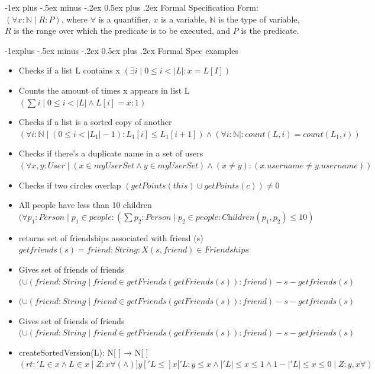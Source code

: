 \documentclass[letterpaper, 8pt]{extarticle}
\makeatletter
\renewcommand{\section}{\@startsection{section}{1}{0mm}%
                                {-1ex plus -.5ex minus -.2ex}%
                                {0.5ex plus .2ex}%
                                {\normalfont\normalsize\bfseries}}
\renewcommand{\subsection}{\@startsection{subsection}{2}{0mm}%
                                {-1explus -.5ex minus -.2ex}%
                                {0.5ex plus .2ex}%
                                {\normalfont\small\bfseries}}
\makeatother
\begin{document}
\begin{multicols*}{5}
  \section{Formal Specification}
  Form: $(\forall x : \mathbb{N} \mid R : P)$,
  where $\forall$ is a quantifier, $x$ is a variable, $\mathbb{N}$ is the type of variable,
  $R$ is the range over which the predicate is to be executed, and $P$ is the predicate.

  \subsection{Formal Spec examples}
  \begin{itemize}
  \setlength\itemsep{0.9em}
    \item Checks if a list L contains x
    $(\exists i \mid 0 \leq i < |L| : x = L [I])$
    \item Counts the amount of times x appears in list L
    $(\sum i \mid 0 \leq i < |L| \land L[i] = x: 1)$
    \item Checks if a list is a sorted copy of another
    $(\forall i: \mathbb{N} \mid (0 \leq i < |L_1| - 1): L_1[i] \leq L_1[i + 1]) \land (\forall i : \mathbb{N}|: count(L, i) = count(L_1, i))$
    \item Checks if there's a duplicate name in a set of users
    $(\forall x,y: User \mid (x \in myUserSet \land y \in myUserSet) \land (x \neq y) : (x.username \neq y.username))$
    \item Checks if two circles overlap
    $(getPoints(this) \cup getPoints(c)) \neq 0$
    \item All people have less than 10 children
    $(\forall p_1 : Person \mid p_1 \in people : (\sum p_2 : Person \mid p_2 \in people: \textit{Children}(p_1, p_2) \leq 10)$
    \item returns set of friendships associated with friend (s)
    $ getfriends(s) = {friend:String:X(s,friend)\in Friendships}$
    \item Gives set of friends of friends
    $(\cup (friend : String \mid friend \in getFriends(getFriends(s)) : friend)-{s}-getfriends(s)$
    \item
    $(\cup (friend : String \mid friend \in getFriends(getFriends(s)) : friend)-{s}-getfriends(s)$
    \item Gives set of friends of friends
    $(\cup (friend : String \mid friend \in getFriends(getFriends(s)) : friend)-{s}-getfriends(s)$
    \item createSortedVersion(L): N[ ] → N[ ]
    $(rt : ′L ∈ x ∧ L ∈ x ∣ Z : x∀( ∧ )]y[′L ≤ ]x[′L : y ≤ x ∧ |′L| ≤ x ≤ 1 ∧ 1 − |′L| ≤ x ≤ 0 ∣ Z : y ,x∀)$
    \end{itemize}

\end{multicols*}
\end{document}
